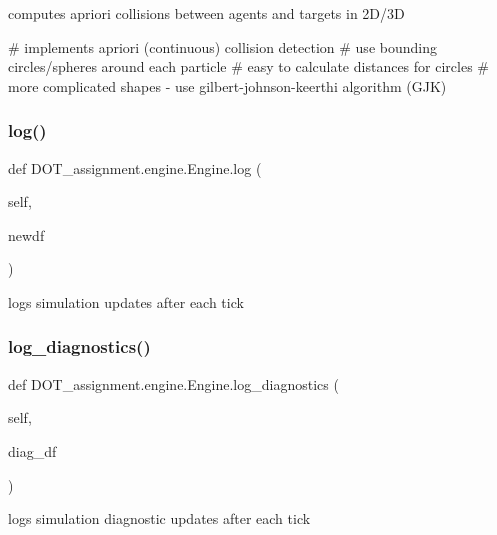 \begin{DoxyVerb}computes apriori collisions between agents and targets in 2D/3D

# implements apriori (continuous) collision detection
# use bounding circles/spheres around each particle
    # easy to calculate distances for circles
    # more complicated shapes - use gilbert-johnson-keerthi algorithm (GJK)\end{DoxyVerb}
 \mbox{\label{class_d_o_t__assignment_1_1engine_1_1_engine_a982ebd173ac561463636cb188056eda4}} 
\subsubsection{\texorpdfstring{log()}{log()}}
{\footnotesize\ttfamily def D\+O\+T\+\_\+assignment.\+engine.\+Engine.\+log (\begin{DoxyParamCaption}\item[{}]{self,  }\item[{}]{newdf }\end{DoxyParamCaption})}

\begin{DoxyVerb}logs simulation updates after each tick
\end{DoxyVerb}
 \mbox{\label{class_d_o_t__assignment_1_1engine_1_1_engine_a683369c41802adb71bc6fcf1c60a6439}} 
\subsubsection{\texorpdfstring{log\_diagnostics()}{log\_diagnostics()}}
{\footnotesize\ttfamily def D\+O\+T\+\_\+assignment.\+engine.\+Engine.\+log\+\_\+diagnostics (\begin{DoxyParamCaption}\item[{}]{self,  }\item[{}]{diag\+\_\+df }\end{DoxyParamCaption})}

\begin{DoxyVerb}logs simulation diagnostic updates after each tick
\end{DoxyVerb}
 \mbox{\label{class_d_o_t__assignment_1_1engine_1_1_engine_ae7c65ec5d3ca05e3e23de9cdf8927639}} 
